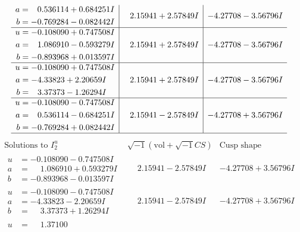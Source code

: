 \documentclass[1p]{elsarticle_modified}
\theoremstyle{definition}
\newcommand{\I}{\sqrt{-1}}
\begin{document}
$$\begin{array}{c|c|c}
\begin{aligned}
a &= \phantom{-}0.536114 + 0.684251 I \\
b &= -0.769284 - 0.082442 I\end{aligned}
 & \phantom{-}2.15941 + 2.57849 I & -4.27708 - 3.56796 I \\ \hline\begin{aligned}
u &= -0.108090 + 0.747508 I \\
a &= \phantom{-}1.086910 - 0.593279 I \\
b &= -0.893968 + 0.013597 I\end{aligned}
 & \phantom{-}2.15941 + 2.57849 I & -4.27708 - 3.56796 I \\ \hline\begin{aligned}
u &= -0.108090 + 0.747508 I \\
a &= -4.33823 + 2.20659 I \\
b &= \phantom{-}3.37373 - 1.26294 I\end{aligned}
 & \phantom{-}2.15941 + 2.57849 I & -4.27708 - 3.56796 I \\ \hline\begin{aligned}
u &= -0.108090 - 0.747508 I \\
a &= \phantom{-}0.536114 - 0.684251 I \\
b &= -0.769284 + 0.082442 I\end{aligned}
 & \phantom{-}2.15941 - 2.57849 I & -4.27708 + 3.56796 I\\
 \hline 
 \end{array}$$\newpage$$\begin{array}{c|c|c}  
\text{Solutions to }I^u_{2}& \I (\text{vol} + \sqrt{-1}CS) & \text{Cusp shape}\\
 \hline 
\begin{aligned}
u &= -0.108090 - 0.747508 I \\
a &= \phantom{-}1.086910 + 0.593279 I \\
b &= -0.893968 - 0.013597 I\end{aligned}
 & \phantom{-}2.15941 - 2.57849 I & -4.27708 + 3.56796 I \\ \hline\begin{aligned}
u &= -0.108090 - 0.747508 I \\
a &= -4.33823 - 2.20659 I \\
b &= \phantom{-}3.37373 + 1.26294 I\end{aligned}
 & \phantom{-}2.15941 - 2.57849 I & -4.27708 + 3.56796 I \\ \hline\begin{aligned}
u &= \phantom{-}1.37100\phantom{ +0.000000I} \\

\end{aligned}
\end{array}$$
\end{document}
